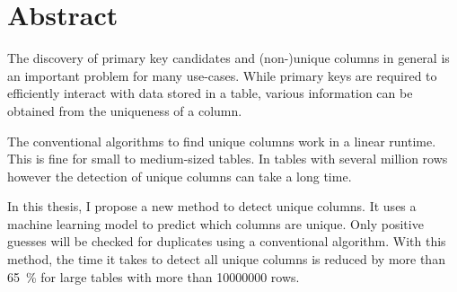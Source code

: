 \begingroup
\let\clearpage\relax
\let\cleardoublepage\relax
\let\cleardoublepage\relax
\chapter*{Abstract}
The discovery of primary key candidates and (non-)unique columns in general is an important problem for many use-cases. While primary keys are required to efficiently interact with data stored in a table, various information can be obtained from the uniqueness of a column. %

The conventional algorithms to find unique columns work in a linear runtime. This is fine for small to medium-sized tables. In tables with several million rows however the detection of unique columns can take a long time.

In this thesis, I propose a new method to detect unique columns. It uses a machine learning model to predict which columns are unique. Only positive guesses will be checked for duplicates using a conventional algorithm. With this method, the time it takes to detect all unique columns is reduced by more than \SI{65}{\percent} for large tables with more than \num{10000000} rows. %

\endgroup

